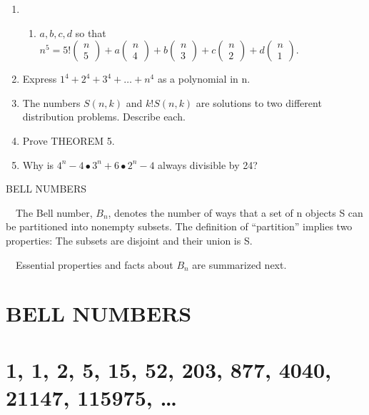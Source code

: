\documentclass{article}
\begin{document}
\begin{enumerate}
\item \begin{enumerate}
\item  $a,b,c,d$ so that 
$n^5=5!\left(\begin{matrix}n\\5\end{matrix}\right)+a\left(\begin{matrix}n\\4\end{matrix}\right)+b\left(\begin{matrix}n\\3\end{matrix}\right)+c\left(\begin{matrix}n\\2\end{matrix}\right)+d\left(\begin{matrix}n\\1\end{matrix}\right)$.
 
\end{enumerate}
\item Express  $1^4+2^4+3^4+{\dots}+n^4$ as a polynomial in n. 
\item The numbers  $S(n,k)$ and  $k!S(n,k)$ are solutions to two different distribution problems. Describe each. 
\item Prove THEOREM 5. 
\item Why is  $4^n-4{\bullet}3^n+6{\bullet}2^n-4$ always divisible by 24?
\end{enumerate}
BELL NUMBERS

\ \ The Bell number,  $B_n$, denotes the number of ways that a set of n objects S can be partitioned into nonempty
subsets. The definition of “partition” implies two properties: The subsets are disjoint and their union is S. 

\ \ Essential properties and facts about  $B_n$ are summarized next. 

\section{}
\section[BELL NUMBERS]{BELL NUMBERS}
\section[1, 1, 2, 5, 15, 52, 203, 877, 4040, 21147, 115975, …]{1, 1, 2, 5, 15, 52, 203, 877, 4040, 21147, 115975, …}
\end{document}
